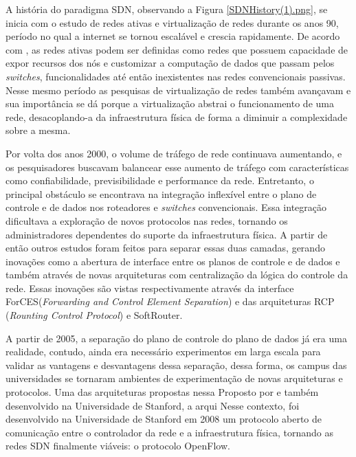 \par A história do paradigma SDN, observando a Figura \ref{SDNHistory(1).png}, se inicia com o estudo de redes ativas e virtualização de redes durante os anos 90, período no qual a internet se tornou escalável e crescia rapidamente\cite{Feamster:2013:RS:2559899.2560327}.
De acordo com , as redes ativas podem ser definidas como redes que possuem capacidade de expor recursos dos nós e customizar a computação de dados que passam pelos \textit{switches}, funcionalidades até então inexistentes nas redes convencionais passivas. Nesse mesmo período as pesquisas de virtualização de redes também avançavam e sua importância se dá porque a virtualização abstrai o funcionamento de uma rede, desacoplando-a da infraestrutura física de forma a diminuir a complexidade sobre a mesma. 
\par Por volta dos anos 2000, o volume de tráfego de rede continuava aumentando, e os pesquisadores buscavam balancear esse aumento de tráfego com características como confiabilidade, previsibilidade e performance da rede. Entretanto, o principal obstáculo se encontrava na integração inflexível entre o plano de controle e de dados nos roteadores e \emph{switches} convencionais. Essa integração dificultava  a exploração de novos protocolos nas redes, tornando os administradores dependentes do suporte da infraestrutura física. A partir de então outros estudos foram feitos para separar essas duas camadas, gerando inovações como a abertura de interface entre os planos de controle e de dados e também através de novas arquiteturas com centralização da lógica do controle da rede. Essas inovações são vistas respectivamente através da interface ForCES(\textit{Forwarding and Control Element Separation}) e das arquiteturas RCP (\textit{Rounting Control Protocol}) e SoftRouter.
\cite{Nunes}
\par A partir de 2005, a separação do plano de controle do plano de dados já era uma realidade, contudo, ainda era necessário experimentos em larga escala para validar as vantagens e desvantagens dessa separação, dessa forma, os campus das universidades se tornaram ambientes de experimentação de novas arquiteturas e protocolos. 
Uma das arquiteturas propostas nessa 
Proposto por  e também desenvolvido na Universidade de Stanford, a arqui
Nesse contexto, foi desenvolvido na Universidade de Stanford em 2008 um protocolo aberto de comunicação entre o controlador da rede e a infraestrutura física, tornando as redes SDN finalmente viáveis: o protocolo OpenFlow\cite{McKeown:2008:OEI:1355734.1355746}.



